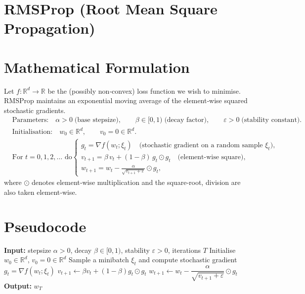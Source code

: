 \documentclass{article}
\newcommand{\RR}{\mathbb{R}}
\begin{document}
\section*{RMSProp (Root Mean Square Propagation)}

\section*{Mathematical Formulation}
Let $f:\RR^{d}\rightarrow\RR$ be the (possibly non‑convex) loss function we wish to minimise.
RMSProp maintains an exponential moving average of the element‑wise squared stochastic
gradients.
\[
\begin{aligned}
&\text{Parameters:}\quad 
\alpha>0\; \text{(base stepsize)},\qquad 
\beta\in[0,1)\; \text{(decay factor)},\qquad 
\varepsilon>0\; \text{(stability constant)}.\\[4pt]
&\text{Initialisation:}\quad 
w_{0}\in\RR^{d},\qquad 
v_{0}=0\in\RR^{d}.\\[4pt]
&\text{For }t=0,1,2,\dots \text{ do}
\begin{cases}
g_{t}= \nabla f(w_{t};\xi_{t}) \quad\text{(stochastic gradient on a random sample }\xi_{t}),\\[4pt]
v_{t+1}= \beta\,v_{t}+(1-\beta)\,g_{t}\odot g_{t}\quad\text{(element‑wise square)},\\[4pt]
w_{t+1}= w_{t}-\displaystyle\frac{\alpha}{\sqrt{v_{t+1}+\varepsilon}}\odot g_{t},
\end{cases}
\end{aligned}
\]
where $\odot$ denotes element‑wise multiplication and the square‑root,
division are also taken element‑wise.  

\section*{Pseudocode}
\begin{algorithm}[H]
\caption{RMSProp}
\begin{algorithmic}[1]
\State \textbf{Input:} stepsize $\alpha>0$, decay $\beta\in[0,1)$, stability $\varepsilon>0$, iterations $T$
\State Initialise $w_{0}\in\RR^{d}$, $v_{0}=0\in\RR^{d}$
    \State Sample a minibatch $\xi_{t}$ and compute stochastic gradient $g_{t}= \nabla f(w_{t};\xi_{t})$
    \State $v_{t+1}\gets \beta v_{t}+(1-\beta) g_{t}\odot g_{t}$
    \State $w_{t+1}\gets w_{t}-\dfrac{\alpha}{\sqrt{v_{t+1}+\varepsilon}}\odot g_{t}$
\EndFor
\State \textbf{Output:} $w_{T}$
\end{algorithmic}
\end{algorithm}
\end{document}
